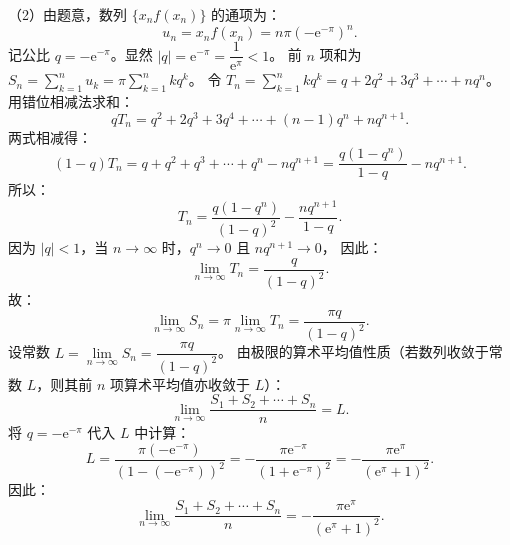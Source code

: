\begin{answer}
（2）由题意，数列 $\{x_n f(x_n)\}$ 的通项为：
\nopagebreak[4]
\[
u_n=x_n f(x_n)=n\pi(-\mathrm{e}^{-\pi})^n.
\]
记公比 $q=-\mathrm{e}^{-\pi}$。显然 $|q|=\mathrm{e}^{-\pi}=\dfrac{1}{\mathrm{e}^\pi}<1$。
前 $n$ 项和为 $S_n=\sum\limits_{k=1}^n u_k=\pi\sum\limits_{k=1}^n k q^k$。
令 $T_n=\sum\limits_{k=1}^n k q^k=q+2q^2+3q^3+\cdots+n q^n$。
用错位相减法求和：
\nopagebreak[4]
\[
q T_n=q^2+2q^3+3q^4+\cdots+(n-1)q^n+n q^{n+1}.
\]
两式相减得：
\nopagebreak[4]
\[
(1-q)T_n=q+q^2+q^3+\cdots+q^n-n q^{n+1}=\frac{q(1-q^n)}{1-q}-n q^{n+1}.
\]
所以：
\nopagebreak[4]
\[
T_n=\frac{q(1-q^n)}{(1-q)^2}-\frac{n q^{n+1}}{1-q}.
\]
因为 $|q|<1$，当 $n\to\infty$ 时，$q^n\to 0$ 且 $n q^{n+1}\to 0$，
因此：
\nopagebreak[4]
\[
\lim_{n\to\infty} T_n=\frac{q}{(1-q)^2}.
\]
故：
\nopagebreak[4]
\[
\lim_{n\to\infty} S_n=\pi\lim_{n\to\infty} T_n=\frac{\pi q}{(1-q)^2}.
\]
设常数 $L=\lim\limits_{n\to\infty} S_n=\dfrac{\pi q}{(1-q)^2}$。
由极限的算术平均值性质（若数列收敛于常数 $L$，则其前 $n$ 项算术平均值亦收敛于 $L$）：
\nopagebreak[4]
\[
\lim_{n\to\infty}\frac{S_1+S_2+\cdots+S_n}{n}=L.
\]
将 $q=-\mathrm{e}^{-\pi}$ 代入 $L$ 中计算：
\nopagebreak[4]
\[
L=\frac{\pi(-\mathrm{e}^{-\pi})}{(1-(-\mathrm{e}^{-\pi}))^2}=-\frac{\pi\mathrm{e}^{-\pi}}{(1+\mathrm{e}^{-\pi})^2}=-\frac{\pi\mathrm{e}^\pi}{(\mathrm{e}^\pi+1)^2}.
\]
因此：
\nopagebreak[4]
\[
\lim_{n\to\infty}\frac{S_1+S_2+\cdots+S_n}{n}=-\frac{\pi\mathrm{e}^\pi}{(\mathrm{e}^\pi+1)^2}.
\]


\end{answer}